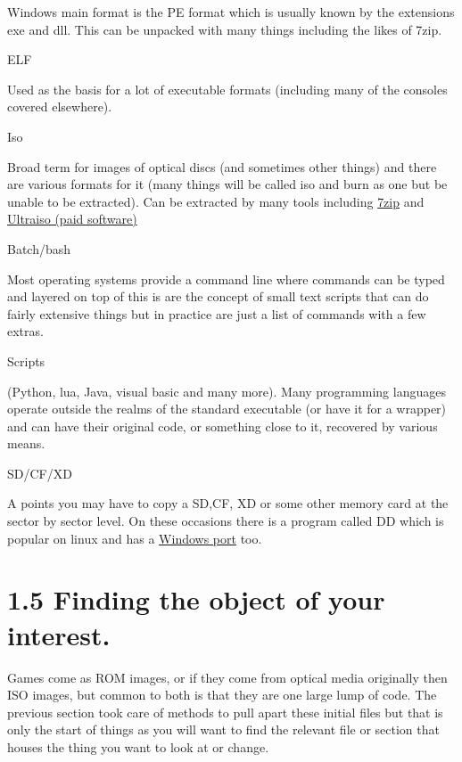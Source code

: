 \documentclass[
]{book}
\begin{document}
Windows main format is the PE format which is usually known by the extensions exe and dll. This can be unpacked with many things including the likes of 7zip.

ELF

Used as the basis for a lot of executable formats (including many of the consoles covered elsewhere).

Iso

Broad term for images of optical discs (and sometimes other things) and there are various formats for it (many things will be called iso and burn as one but be unable to be extracted). Can be extracted by many tools including \href{http://www.7-zip.org/}{7zip} and \href{http://www.ezbsystems.com/ultraiso/}{Ultraiso (paid software)}

Batch/bash

Most operating systems provide a command line where commands can be typed and layered on top of this is are the concept of small text scripts that can do fairly extensive things but in practice are just a list of commands with a few extras.

Scripts

(Python, lua, Java, visual basic and many more). Many programming languages operate outside the realms of the standard executable (or have it for a wrapper) and can have their original code, or something close to it, recovered by various means.

SD/CF/XD

A points you may have to copy a SD,CF, XD or some other memory card at the sector by sector level. On these occasions there is a program called DD which is popular on linux and has a \href{http://www.chrysocome.net/dd}{Windows port} too.

\hypertarget{finding-the-object-of-your-interest.}{%
\section{1.5 Finding the object of your interest.}\label{finding-the-object-of-your-interest.}}

Games come as ROM images, or if they come from optical media originally then ISO images, but common to both is that they are one large lump of code. The previous section took care of methods to pull apart these initial files but that is only the start of things as you will want to find the relevant file or section that houses the thing you want to look at or change.
\end{document}
